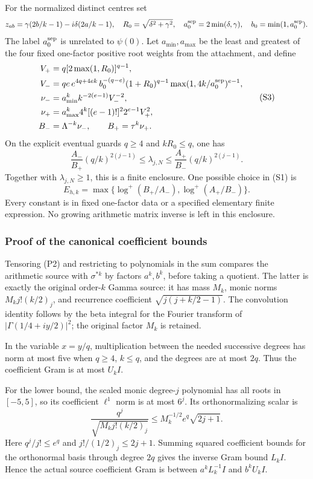 \documentclass[11pt]{article}
\begin{document}
For the normalized distinct centres set \[
z_{ab}=\gamma(2b/k-1)-i\delta(2a/k-1),\quad
R_0=\sqrt{\delta^2+\gamma^2},\quad
a_0^{\rm sep}=2\min(\delta,\gamma),\quad b_0=\min(1,a_0^{\rm sep}).
\] The label \(a_0^{\rm sep}\) is unrelated to \(\psi(0)\). Let \(a_{\min},a_{\max}\) be the least and greatest of the four fixed one-factor positive root weights from the attachment, and define \[
\begin{aligned}
V_+&=q[2\max(1,R_0)]^{q-1},\\
V_-&=qe\,e^{4q+4ek}\,
 b_0^{-(q-e)}(1+R_0)^{q-1}
 \max(1,4k/a_0^{\rm sep})^{e-1},\\
\nu_-&=a_{\min}^k k^{-2(e-1)}V_-^{-2},\\
\nu_+&=a_{\max}^k4^k[(e-1)!]^2 2^{e-1} V_+^2,\\
B_-&=\Lambda^{-k}\nu_-,\qquad B_+=\tau^k\nu_+.
\end{aligned} \tag{S3}
\] On the explicit eventual guards \(q\ge4\) and \(kR_0\le q\), one has \[
 \boxed{
 \frac{A_-}{B_+}(q/k)^{2(j-1)}
 \le\lambda_{j,N}
 \le\frac{A_+}{B_-}(q/k)^{2(j-1)}.
 } \tag{S4}
\] Together with \(\lambda_{j,N}\ge1\), this is a finite enclosure. One possible choice in (S1) is \[
 E_{h,k}=\max\{\log^+(B_+/A_-),\log^+(A_+/B_-)\}. \tag{S5}
\] Every constant is in fixed one-factor data or a specified elementary finite expression. No growing arithmetic matrix inverse is left in this enclosure.

\subsubsection{Proof of the canonical coefficient bounds}\label{proof-of-the-canonical-coefficient-bounds}

Tensoring (P2) and restricting to polynomials in the sum compares the arithmetic source with \(\sigma^{*k}\) by factors \(a^k,b^k\), before taking a quotient. The latter is exactly the original order-\(k\) Gamma source: it has mass \(M_k\), monic norms \(M_k j!(k/2)_j\), and recurrence coefficient \(\sqrt{j(j+k/2-1)}\). The convolution identity follows by the beta integral for the Fourier transform of \(|\Gamma(1/4+iy/2)|^2\); the original factor \(M_k\) is retained.

In the variable \(x=y/q\), multiplication between the needed successive degrees has norm at most five when \(q\ge4\), \(k\le q\), and the degrees are at most \(2q\). Thus the coefficient Gram is at most \(U_kI\).

For the lower bound, the scaled monic degree-\(j\) polynomial has all roots in \([-5,5]\), so its coefficient \(\ell^1\) norm is at most \(6^j\). Its orthonormalizing scalar is \[
 \frac{q^j}{\sqrt{M_kj!(k/2)_j}}
 \le M_k^{-1/2}e^q\sqrt{2j+1}.
\] Here \(q^j/j!\le e^q\) and \(j!/(1/2)_j\le2j+1\). Summing squared coefficient bounds for the orthonormal basis through degree \(2q\) gives the inverse Gram bound \(L_kI\). Hence the actual source coefficient Gram is between \(a^kL_k^{-1}I\) and \(b^kU_kI\).
\end{document}
